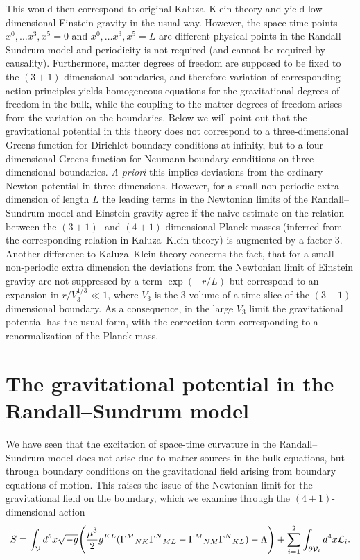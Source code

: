 \documentclass[12pt,fleqn]{article}
\newcommand{\be}{\begin{equation}}
\newcommand{\ee}{\end{equation}}
\begin{document}
This would then correspond to original Kaluza--Klein
theory and yield low-dimensional Einstein gravity
in the usual way.
However, the space-time points $x^0,\ldots x^3,x^5=0$
and $x^0,\ldots x^3,x^5=L$ are different physical points in 
the Randall--Sundrum model
and periodicity is not required (and cannot be required
by causality). Furthermore, matter degrees of freedom are supposed
to be fixed to the $(3+1)$-dimensional boundaries, and therefore
variation of corresponding action principles yields
homogeneous equations for the gravitational degrees
of freedom in the bulk, while the coupling to the matter
degrees of freedom arises from the variation on the boundaries.
Below we will point out that the gravitational
potential in this theory does not
correspond to a three-dimensional Greens function for 
Dirichlet boundary conditions
at infinity, but to a four-dimensional 
Greens function for Neumann boundary conditions
on three-dimensional boundaries. 
{\it A priori} this implies deviations from the ordinary
Newton potential in three dimensions. 
However, for a small non-periodic extra dimension 
of length $L$ the
leading terms in the Newtonian limits of the Randall--Sundrum
model and
Einstein gravity agree if the naive estimate
on the relation between the $(3+1)$- and $(4+1)$-dimensional
 Planck masses (inferred from the corresponding
relation in Kaluza--Klein theory)
is augmented by a factor 3. Another difference 
to Kaluza--Klein theory concerns the fact, that 
for a small non-periodic extra dimension
 the deviations from the Newtonian
limit of Einstein gravity are not suppressed by a term
 $\exp(-r/L)$ but correspond to an expansion in
 $r/V_3^{1/3}\ll 1$, where $V_3$
is the 3-volume of a time slice
of the $(3+1)$-dimensional boundary. 
As a consequence, in the large $V_3$ limit
the gravitational potential has the usual form, with the correction
term corresponding to a renormalization
of the Planck mass.

\section{The gravitational potential in the Randall--Sun\-drum model}

We have seen that
the excitation of space-time curvature
in the Randall--Sundrum model
does not arise due to
matter sources in the bulk equations, but through boundary conditions
on the gravitational field arising from boundary equations
of motion. This raises the issue of the Newtonian limit
for the gravitational field
on the boundary, which we examine through the $(4+1)$-dimensional
action
\be\label{action}
S=\int_{\cal V} d^5x \sqrt{-g}\Bigg(\frac{\mu^3}{2}g^{KL}
(\Gamma^M{}_{NK}\Gamma^N{}_{ML}-\Gamma^M{}_{NM}\Gamma^N{}_{KL})-\Lambda\Bigg)
+\sum_{i=1}^2\int_{\partial{\cal V}_i} d^4x{\cal L}_i.
\ee
\end{document}
